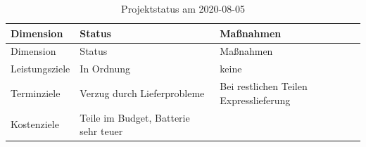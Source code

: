 \documentclass[
    headings=optiontotocandhead,%
    twoside,
    numbers=noenddot,%
    12pt, %
    titlepage, %
    parskip=full, %
    listof=leveldown, 
    numbers=noenddot, %
    a4paper,DIV=14,
    BCOR=15mm,
]{scrbook}
\begin{document}
\begin{longtable}[]{@{}lll@{}}
\caption{Projektstatus am 2020-08-05}\tabularnewline
\toprule
\begin{minipage}[b]{0.30\columnwidth}\raggedright
Dimension\strut
\end{minipage} & \begin{minipage}[b]{0.27\columnwidth}\raggedright
Status\strut
\end{minipage} & \begin{minipage}[b]{0.34\columnwidth}\raggedright
Maßnahmen\strut
\end{minipage}\tabularnewline
\midrule
\endfirsthead
\toprule
\begin{minipage}[b]{0.30\columnwidth}\raggedright
Dimension\strut
\end{minipage} & \begin{minipage}[b]{0.27\columnwidth}\raggedright
Status\strut
\end{minipage} & \begin{minipage}[b]{0.34\columnwidth}\raggedright
Maßnahmen\strut
\end{minipage}\tabularnewline
\midrule
\endhead
\begin{minipage}[t]{0.30\columnwidth}\raggedright
Leistungsziele\strut
\end{minipage} & \begin{minipage}[t]{0.27\columnwidth}\raggedright
In Ordnung\strut
\end{minipage} & \begin{minipage}[t]{0.34\columnwidth}\raggedright
keine\strut
\end{minipage}\tabularnewline
\begin{minipage}[t]{0.30\columnwidth}\raggedright
Terminziele\strut
\end{minipage} & \begin{minipage}[t]{0.27\columnwidth}\raggedright
Verzug durch Lieferprobleme\strut
\end{minipage} & \begin{minipage}[t]{0.34\columnwidth}\raggedright
Bei restlichen Teilen Expresslieferung\strut
\end{minipage}\tabularnewline
\begin{minipage}[t]{0.30\columnwidth}\raggedright
Kostenziele\strut
\end{minipage} & \begin{minipage}[t]{0.27\columnwidth}\raggedright
Teile im Budget, Batterie sehr teuer\strut
\end{minipage} & \begin{minipage}[t]{0.34\columnwidth}\raggedright

\end{minipage}
\end{longtable}
\end{document}

